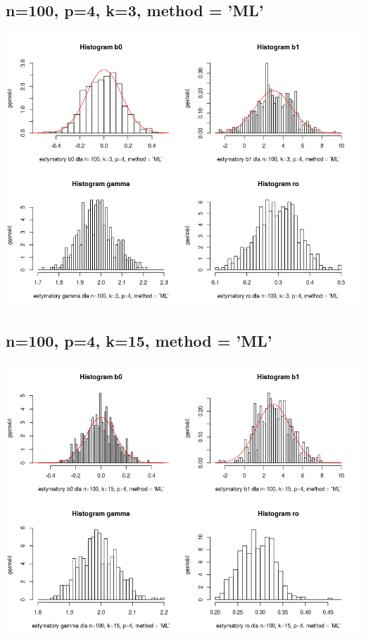 \documentclass[a4paper,11pt]{article}
\begin{document}
\subsection{n=100, p=4,  k=3,  method = 'ML'}
\includegraphics[scale=.8]{Rplot63.png} 

\subsection{n=100, p=4,  k=15,  method = 'ML'}
\includegraphics[scale=.8]{Rplot64.png}
\end{document}
